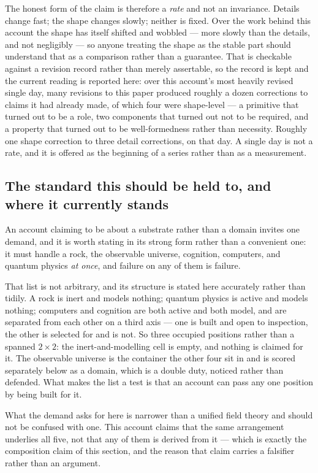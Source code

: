 \documentclass[11pt,a4paper]{article}
\theoremstyle{remark}\newtheorem{remark}[definition]{Remark}
\begin{document}
The honest form of the claim is therefore a \emph{rate} and not an invariance. Details change fast;
the shape changes slowly; neither is fixed. Over the work behind this account the shape has itself
shifted and wobbled --- more slowly than the details, and not negligibly --- so anyone treating the
shape as the stable part should understand that as a comparison rather than a guarantee. That is checkable against a revision record rather than
merely assertable, so the record is kept and the current reading is reported here: over this
account's most heavily revised single day, many revisions to this paper produced roughly a
dozen corrections to claims it had already made, of which four were shape-level --- a primitive that
turned out to be a role, two components that turned out not to be required, and a property that
turned out to be well-formedness rather than necessity. Roughly one shape correction to three detail
corrections, on that day. A single day is not a rate, and it is offered as the beginning of a series
rather than as a measurement.

\subsection*{The standard this should be held to, and where it currently stands}

An account claiming to be about a substrate rather than a domain invites one demand, and it is worth
stating in its strong form rather than a convenient one: it must handle a rock, the observable
universe, cognition, computers, and quantum physics \emph{at once}, and failure on any of them is
failure.

That list is not arbitrary, and its structure is stated here accurately rather than tidily. A rock is inert and models nothing; quantum physics is active and models nothing; computers
and cognition are both active and both model, and are separated from each other on a third axis ---
one is built and open to inspection, the other is selected for and is not. So three occupied
positions rather than a spanned $2\times2$: the inert-and-modelling cell is empty, and nothing is
claimed for it. The observable universe is the container the other four sit in and is scored
separately below as a domain, which is a double duty, noticed rather than defended. What makes
the list a test is that an account can pass any one position by being built for it.

What the demand asks for here is narrower than a unified field theory and should not be confused with
one. This account claims that the same arrangement underlies all five, not that any of them is
derived from it --- which is exactly the composition claim of this section, and the reason that claim
carries a falsifier rather than an argument.
\end{document}
